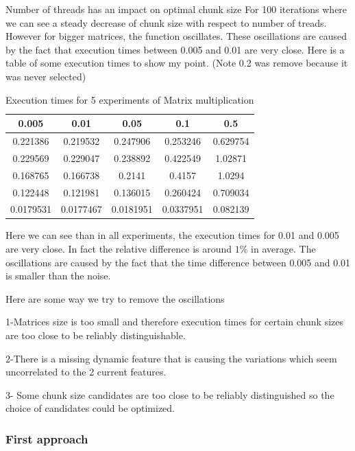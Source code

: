 Number of threads has an impact on optimal chunk size For 100 iterations where we can see a steady decrease of chunk size with respect to number of treads. However for bigger matrices, the function oscillates. These oscillations are caused by the fact that execution times between 0.005 and 0.01 are very close. Here is a table of some execution times to show my point. (Note 0.2 was remove because it was never selected)

\begin{table}[h]
	\centering
	\caption{Execution times for 5 experiments of Matrix multiplication}
	\label{my-label}
	\begin{tabular}{|c|c|c|c|c|}
		\hline
		0.005& 0.01           & 0.05 & 0.1 & 0.5 \\ \hline
		0.221386 & 0.219532  & 0.247906    & 0.253246        & 0.629754 \\ \hline
		0.229569 & 0.229047 & 0.238892   & 0.422549        & 1.02871  \\ \hline
		0.168765 & 0.166738  & 0.2141   & 0.4157       & 1.0294  \\ \hline
		0.122448 & 0.121981  & 0.136015    & 0.260424        & 0.709034 \\ \hline
		0.0179531 & 0.0177467 & 0.0181951  & 0.0337951        & 0.082139 \\ \hline
	\end{tabular}
\end{table}

Here we can see than in all experiments, the execution times for 0.01 and 0.005 are very close. In fact the relative difference is around $1\%$ in average. The oscillations are caused by the fact that the time difference between 0.005 and 0.01 is smaller than the noise.

Here are some way we try to remove the oscillations

1-Matrices size is too small and therefore execution times for certain chunk sizes are too close to be reliably distinguishable.

2-There is a missing dynamic feature that is causing the variations which seem uncorrelated to the 2 current features.

3- Some chunk size candidates are too close to be reliably distinguished so the choice of candidates could be optimized.
\
\subsubsection{First approach}


